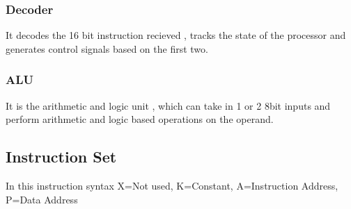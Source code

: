 \documentclass[11pt]{article}
\begin{document}
\subsubsection{Decoder}
It decodes the 16 bit instruction recieved , tracks the state of the processor and generates control signals based on the first two.
\subsubsection{ALU}
It is the arithmetic and logic unit , which can take in 1 or 2 8bit inputs and perform arithmetic and logic based operations on the operand. 
\subsection{Instruction Set}
\label{sec:org4f08230}

In this instruction syntax X=Not used, K=Constant, A=Instruction Address, P=Data Address
\end{document}
